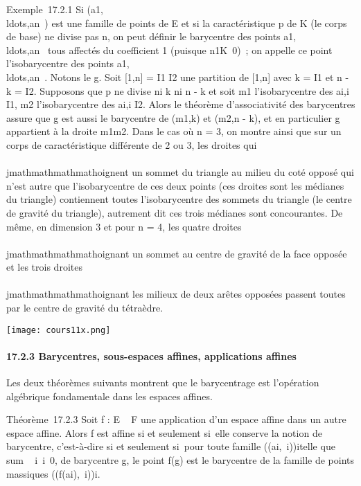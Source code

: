 Exemple~17.2.1 Si
(a1,\\ldots,an~)
est une famille de points de E et si la caractéristique p de K (le corps
de base) ne divise pas n, on peut définir le barycentre des points
a1,\\ldots,an~
tous affectés du coefficient 1 (puisque
n1K\neq~0)~; on appelle ce point
l'isobarycentre des points
a1,\\ldots,an~.
Notons le g. Soit {[}1,n{]} = I1 \cup I2 une partition
de {[}1,n{]} avec k = \textbar{}I1\textbar{} et n - k =
\textbar{}I2\textbar{}. Supposons que p ne divise ni k ni n -
k et soit m1 l'isobarycentre des ai,i \in
I1, m2 l'isobarycentre des ai,i \in
I2. Alors le théorème d'associativité des barycentres assure
que g est aussi le barycentre de (m1,k) et (m2,n -
k), et en particulier g appartient à la droite m1m2.
Dans le cas où n = 3, on montre ainsi que sur un corps de
caractéristique différente de 2 ou 3, les droites qui \\\\jmathmathmathmathoignent un sommet
du triangle au milieu du coté opposé qui n'est autre que l'isobarycentre
de ces deux points (ces droites sont les médianes du triangle)
contiennent toutes l'isobarycentre des sommets du triangle (le centre de
gravité du triangle), autrement dit ces trois médianes sont
concourantes. De même, en dimension 3 et pour n = 4, les quatre droites
\\\\jmathmathmathmathoignant un sommet au centre de gravité de la face opposée et les trois
droites \\\\jmathmathmathmathoignant les milieux de deux arêtes opposées passent toutes par
le centre de gravité du tétraèdre.

\texttt{[image: cours11x.png]}

\paragraph{17.2.3 Barycentres, sous-espaces affines, applications
affines}

Les deux théorèmes suivants montrent que le barycentrage est l'opération
algébrique fondamentale dans les espaces affines.

Théorème~17.2.3 Soit f : E \rightarrow~ F une application d'un espace affine dans
un autre espace affine. Alors f est affine si et seulement si~elle
conserve la notion de barycentre, c'est-à-dire si et seulement si~pour
toute famille \left
((ai,\lambda~i)\right )i\inI telle que
\\sum ~
i\inI\lambda~i\neq~0, de barycentre g,
le point f(g) est le barycentre de la famille de points massiques
\left
((f(ai),\lambda~i)\right )i\inI.

